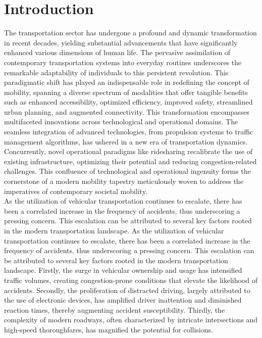 \documentclass[10pt, conference, a4paper, compsocconf]{IEEEtran}
\begin{document}
\section{Introduction}
The transportation sector has undergone a profound and dynamic transformation in recent decades, yielding substantial advancements that have significantly enhanced various dimensions of human life. The pervasive assimilation of contemporary transportation systems into everyday routines underscores the remarkable adaptability of individuals to this persistent revolution. This paradigmatic shift has played an indispensable role in redefining the concept of mobility, spanning a diverse spectrum of modalities that offer tangible benefits such as enhanced accessibility, optimized efficiency, improved safety, streamlined urban planning, and augmented connectivity. This transformation encompasses multifaceted innovations across technological and operational domains. The seamless integration of advanced technologies, from propulsion systems to traffic management algorithms, has ushered in a new era of transportation dynamics. Concurrently, novel operational paradigms like ridesharing recalibrate the use of existing infrastructure, optimizing their potential and reducing congestion-related challenges. This confluence of technological and operational ingenuity forms the cornerstone of a modern mobility tapestry meticulously woven to address the imperatives of contemporary societal mobility.\\
\indent As the utilization of vehicular transportation continues to escalate, there has been a correlated increase in the frequency of accidents, thus underscoring a pressing concern. This escalation can be attributed to several key factors rooted in the modern transportation landscape. As the utilization of vehicular transportation continues to escalate, there has been a correlated increase in the frequency of accidents, thus underscoring a pressing concern. This escalation can be attributed to several key factors rooted in the modern transportation landscape. Firstly, the surge in vehicular ownership and usage has intensified traffic volumes, creating congestion-prone conditions that elevate the likelihood of accidents. Secondly, the proliferation of distracted driving, largely attributed to the use of electronic devices, has amplified driver inattention and diminished reaction times, thereby augmenting accident susceptibility. Thirdly, the complexity of modern roadways, often characterized by intricate intersections and high-speed thoroughfares, has magnified the potential for collisions.\\
\end{document}
